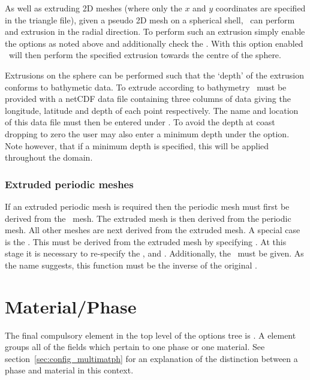 As well as extruding 2D meshes (where only the $x$ and $y$ coordinates are
specified in the triangle file), given a pseudo 2D mesh on a spherical
shell, \fluidity\ can perform and extrusion in the radial direction. To
perform such an extrusion simply enable the options as noted above and
additionally check the . With this
option enabled \fluidity\ will then perform the specified extrusion towards
the centre of the sphere.

Extrusions on the sphere can be performed such that the `depth' of the extrusion
conforms to bathymetic data. To extrude according
to bathymetry \fluidity\ must be provided with a netCDF data file containing
three columns of data giving the longitude, latitude and depth
of each point respectively. The name and location of this data file must then be
entered under .
To avoid the depth at coast dropping to zero the user may also enter a minimum
depth under the  option. Note however, that
if a minimum depth is specified, this will be applied throughout the domain.

\subsubsection{Extruded periodic meshes}\label{sect:extrudedperiodic}

If an extruded periodic mesh is required then the periodic mesh must first
be derived from the \ mesh. The extruded mesh is then
derived from the periodic mesh. All other meshes are next derived from the
extruded mesh. A special case is the . This must be
derived from the extruded mesh by specifying
. At this stage it
is necessary to re-specify the ,
 and . Additionally, the
\ must be given. As the name suggests, this
function must be the inverse of the original .


\section{Material/Phase}
The final compulsory element in the top level of the options tree is
.  A  element groups all
of the fields which pertain to one phase or one material. See
section~\ref{sec:config_multimatph} for an explanation of the distinction
between a phase and material in this context.


